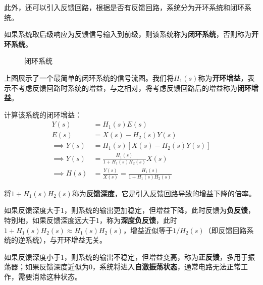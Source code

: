 \documentclass{ctexbook}
\begin{document}
此外，还可以引入反馈回路，根据是否有反馈回路，系统分为开环系统和闭环系统。
\begin{definition}[开环系统与闭环系统]
    如果系统取后级响应为反馈信号输入到前级，则该系统称为\textbf{闭环系统}，否则称为\textbf{开环系统}。
\end{definition}

\begin{figure}[H]
    \centering
    \caption{闭环系统}
\end{figure}

上图展示了一个最简单的闭环系统的信号流图。我们将$H_1(s)$称为\textbf{开环增益}，表示不考虑反馈回路时系统的增益，与之相对，将考虑反馈回路后的增益称为\textbf{闭环增益}。

计算该系统的闭环增益：
\begin{align*}
    Y(s)&=H_1(s)E(s)\\
    E(s)&=X(s)-H_2(s)Y(s)\\
    \implies Y(s)&=H_1(s)\left[X(s)-H_2(s)Y(s)\right]\\
    \implies Y(s)&=\frac{H_1(s)}{1+H_1(s)H_2(s)}X(s)\\
    \implies H(s)&=\frac{Y(s)}{X(s)}=\frac{H_1(s)}{1+H_1(s)H_2(s)}
\end{align*}

\begin{definition}[反馈深度与反馈类型]
将$1+H_1(s)H_2(s)$称为\textbf{反馈深度}，它是引入反馈回路导致的增益下降的倍率。

如果反馈深度大于1，则系统的输出更加稳定，但增益下降，此时反馈为\textbf{负反馈}，特别地，如果反馈深度远大于1，称为\textbf{深度负反馈}，此时$1+H_1(s)H_2(s)\approx H_1(s)H_2(s)$，增益近似等于$1/H_2(s)$（即反馈回路系统的逆系统），与开环增益无关。

如果反馈深度小于1，则系统的输出不稳定，但增益变高，称为\textbf{正反馈}，多用于振荡器；如果反馈深度近似为0，系统将进入\textbf{自激振荡状态}，通常电路无法正常工作，需要消除这种状态。
\end{definition}
\end{document}
